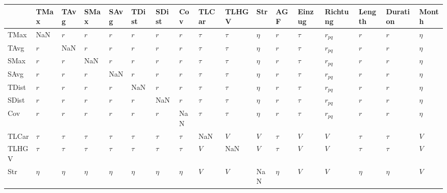 \begin{tabular}{lllllllllllllllll}
\toprule
{} &      TMax &      TAvg &      SMax &      SAvg &     TDist &     SDist &       Cov &   TLCar &   TLHGV &     Str &       AGF &  Einzug &  Richtung &    Length &  Duration &   Month \\
\midrule
TMax     &       NaN &       $r$ &       $r$ &       $r$ &       $r$ &       $r$ &       $r$ &  $\tau$ &  $\tau$ &  $\eta$ &       $r$ &  $\tau$ &  $r_{pq}$ &       $r$ &       $r$ &  $\eta$ \\
TAvg     &       $r$ &       NaN &       $r$ &       $r$ &       $r$ &       $r$ &       $r$ &  $\tau$ &  $\tau$ &  $\eta$ &       $r$ &  $\tau$ &  $r_{pq}$ &       $r$ &       $r$ &  $\eta$ \\
SMax     &       $r$ &       $r$ &       NaN &       $r$ &       $r$ &       $r$ &       $r$ &  $\tau$ &  $\tau$ &  $\eta$ &       $r$ &  $\tau$ &  $r_{pq}$ &       $r$ &       $r$ &  $\eta$ \\
SAvg     &       $r$ &       $r$ &       $r$ &       NaN &       $r$ &       $r$ &       $r$ &  $\tau$ &  $\tau$ &  $\eta$ &       $r$ &  $\tau$ &  $r_{pq}$ &       $r$ &       $r$ &  $\eta$ \\
TDist    &       $r$ &       $r$ &       $r$ &       $r$ &       NaN &       $r$ &       $r$ &  $\tau$ &  $\tau$ &  $\eta$ &       $r$ &  $\tau$ &  $r_{pq}$ &       $r$ &       $r$ &  $\eta$ \\
SDist    &       $r$ &       $r$ &       $r$ &       $r$ &       $r$ &       NaN &       $r$ &  $\tau$ &  $\tau$ &  $\eta$ &       $r$ &  $\tau$ &  $r_{pq}$ &       $r$ &       $r$ &  $\eta$ \\
Cov      &       $r$ &       $r$ &       $r$ &       $r$ &       $r$ &       $r$ &       NaN &  $\tau$ &  $\tau$ &  $\eta$ &       $r$ &  $\tau$ &  $r_{pq}$ &       $r$ &       $r$ &  $\eta$ \\
TLCar    &    $\tau$ &    $\tau$ &    $\tau$ &    $\tau$ &    $\tau$ &    $\tau$ &    $\tau$ &     NaN &     $V$ &     $V$ &    $\tau$ &     $V$ &       $V$ &    $\tau$ &    $\tau$ &     $V$ \\
TLHGV    &    $\tau$ &    $\tau$ &    $\tau$ &    $\tau$ &    $\tau$ &    $\tau$ &    $\tau$ &     $V$ &     NaN &     $V$ &    $\tau$ &     $V$ &       $V$ &    $\tau$ &    $\tau$ &     $V$ \\
Str      &    $\eta$ &    $\eta$ &    $\eta$ &    $\eta$ &    $\eta$ &    $\eta$ &    $\eta$ &     $V$ &     $V$ &     NaN &    $\eta$ &     $V$ &       $V$ &    $\eta$ &    $\eta$ &     $V$ \\

\end{tabular}
